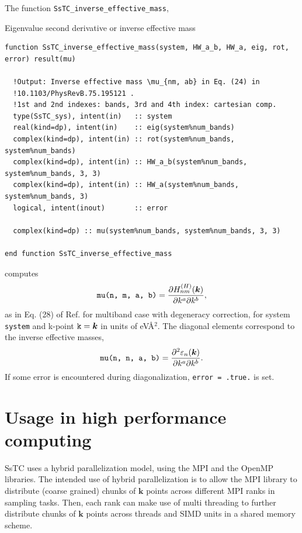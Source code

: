 \documentclass[10pt,a4paper]{article}
\begin{document}
The function \verb|SsTC_inverse_effective_mass|,
\begin{codebox}{Eigenvalue second derivative or inverse effective mass}
\begin{lstlisting}[caption={Interface of ``Inverse effectve mass".},captionpos=b]
function SsTC_inverse_effective_mass(system, HW_a_b, HW_a, eig, rot, error) result(mu)

  !Output: Inverse effective mass \mu_{nm, ab} in Eq. (24) in
  !10.1103/PhysRevB.75.195121 .
  !1st and 2nd indexes: bands, 3rd and 4th index: cartesian comp.
  type(SsTC_sys), intent(in)   :: system
  real(kind=dp), intent(in)    :: eig(system%num_bands)
  complex(kind=dp), intent(in) :: rot(system%num_bands, system%num_bands)
  complex(kind=dp), intent(in) :: HW_a_b(system%num_bands, system%num_bands, 3, 3)
  complex(kind=dp), intent(in) :: HW_a(system%num_bands, system%num_bands, 3)
  logical, intent(inout)       :: error

  complex(kind=dp) :: mu(system%num_bands, system%num_bands, 3, 3)
  
end function SsTC_inverse_effective_mass
\end{lstlisting}
\end{codebox}
computes 
\begin{equation}
\verb|mu(n, m, a, b)| = \frac{\partial H_{nm}^{(H)}(\bm{k})}{\partial k^a \partial k^b},
\end{equation}
as in Eq. (28) of Ref. \cite{yatesSpectralFermiSurface2007} for multiband case with degeneracy correction, for system \verb|system| and k-point $\verb|k| = \bm{k}$ in units of eV\r{A}$^2$. The diagonal elements correspond to the inverse effective masses,
\begin{equation}
\verb|mu(n, n, a, b)| = \frac{\partial^2\varepsilon_n(\bm{k})}{\partial k^a\partial k^b}.
\end{equation}
If some error is encountered during diagonalization, \verb|error = .true.| is set.
\section{Usage in high performance computing}
SsTC uses a hybrid parallelization model, using the MPI \cite{messagepassinginterfaceforumMPIMessagePassingInterface2021} and the OpenMP \cite{openmparchitecturereviewboardOpenMPApplicationProgramming2021} libraries. The intended use of hybrid parallelization is to allow the MPI library to distribute (coarse grained) chunks of $\bm{k}$ points across different MPI ranks in sampling tasks. Then, each rank can make use of multi threading to further distribute chunks of $\bm{k}$ points across threads and SIMD units in a shared memory scheme.
\end{document}
